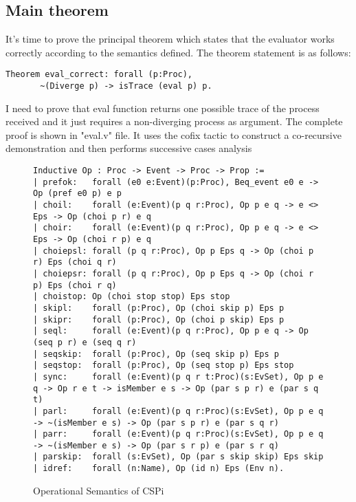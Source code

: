 \documentclass{comjnl}
\begin{document}
\subsection{Main theorem}
It's time to prove the principal theorem which states that the evaluator works correctly according to the semantics defined. The theorem statement is as follows:
\begin{verbatim}
Theorem eval_correct: forall (p:Proc), 
       ~(Diverge p) -> isTrace (eval p) p.
\end{verbatim}
I need to prove that eval function returns one possible trace of the process received and it just requires a non-diverging process as argument. The complete proof is shown in "eval.v" file. It uses the cofix tactic to construct a co-recursive demonstration and then performs successive cases analysis





\begin{figure*}[!ht]
\caption{\label{fig:my-label} Operational Semantics of CSPi}
\begin{verbatim}
Inductive Op : Proc -> Event -> Proc -> Prop :=
| prefok:   forall (e0 e:Event)(p:Proc), Beq_event e0 e -> Op (pref e0 p) e p
| choil:    forall (e:Event)(p q r:Proc), Op p e q -> e <> Eps -> Op (choi p r) e q
| choir:    forall (e:Event)(p q r:Proc), Op p e q -> e <> Eps -> Op (choi r p) e q
| choiepsl: forall (p q r:Proc), Op p Eps q -> Op (choi p r) Eps (choi q r)
| choiepsr: forall (p q r:Proc), Op p Eps q -> Op (choi r p) Eps (choi r q)
| choistop: Op (choi stop stop) Eps stop
| skipl:    forall (p:Proc), Op (choi skip p) Eps p
| skipr:    forall (p:Proc), Op (choi p skip) Eps p
| seql:     forall (e:Event)(p q r:Proc), Op p e q -> Op (seq p r) e (seq q r)
| seqskip:  forall (p:Proc), Op (seq skip p) Eps p
| seqstop:  forall (p:Proc), Op (seq stop p) Eps stop
| sync:     forall (e:Event)(p q r t:Proc)(s:EvSet), Op p e q -> Op r e t -> isMember e s -> Op (par s p r) e (par s q t)
| parl:     forall (e:Event)(p q r:Proc)(s:EvSet), Op p e q -> ~(isMember e s) -> Op (par s p r) e (par s q r)
| parr:     forall (e:Event)(p q r:Proc)(s:EvSet), Op p e q -> ~(isMember e s) -> Op (par s r p) e (par s r q)
| parskip:  forall (s:EvSet), Op (par s skip skip) Eps skip
| idref:    forall (n:Name), Op (id n) Eps (Env n).
\end{verbatim}
\end{figure*}
\end{document}
